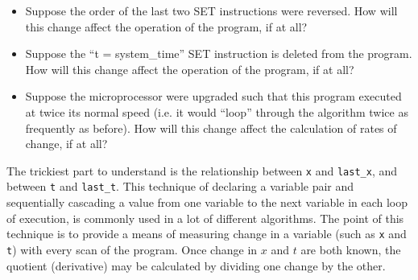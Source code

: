 \begin{itemize}
\item{} Suppose the order of the last two SET instructions were reversed.  How will this change affect the operation of the program, if at all?
\item{} Suppose the ``t = system\_time'' SET instruction is deleted from the program.  How will this change affect the operation of the program, if at all?
\item{} Suppose the microprocessor were upgraded such that this program executed at twice its normal speed (i.e. it would ``loop'' through the algorithm twice as frequently as before).  How will this change affect the calculation of rates of change, if at all?
\end{itemize}







The trickiest part to understand is the relationship between {\tt x} and {\tt last\_x}, and between {\tt t} and {\tt last\_t}.  This technique of declaring a variable pair and sequentially cascading a value from one variable to the next variable in each loop of execution, is commonly used in a lot of different algorithms.  The point of this technique is to provide a means of measuring change in a variable (such as {\tt x} and {\tt t}) with every scan of the program.  Once change in $x$ and $t$ are both known, the quotient (derivative) may be calculated by dividing one change by the other.










